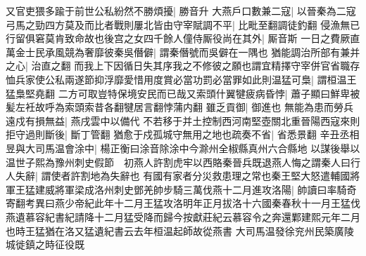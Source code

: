 又官吏猥多踰于前世公私紛然不勝煩擾|{
	勝音升}
大燕戶口數兼二寇|{
	以晉秦為二寇}
弓馬之勁四方莫及而比者戰則屢北皆由守宰賦調不平|{
	比毗至翻調徒釣翻}
侵漁無已行留俱窘莫肯致命故也後宫之女四千餘人僮侍厮役尚在其外|{
	厮音斯}
一日之費厥直萬金士民承風競為奢靡彼秦吳僭僻|{
	謂秦僭號而吳僻在一隅也}
猶能調治所部有兼并之心|{
	治直之翻}
而我上下因循日失其序我之不修彼之願也謂宜精擇守宰併官省職存恤兵家使公私兩遂節抑浮靡愛惜用度賞必當功罰必當罪如此則温猛可梟|{
	謂桓温王猛梟堅堯翻}
二方可取豈特保境安民而已哉又索頭什翼犍疲病昏悖|{
	蕭子顯曰鮮卑被髪左衽故呼為索頭索昔各翻犍居言翻悖蒲内翻}
雖乏貢御|{
	御進也}
無能為患而勞兵遠戍有損無益|{
	燕戌雲中以備代}
不若移于并土控制西河南堅壺關北重晉陽西寇來則拒守過則斷後|{
	斷丁管翻}
猶愈于戍孤城守無用之地也疏奏不省|{
	省悉景翻}
辛丑丞相昱與大司馬温會涂中|{
	楊正衡曰涂音除涂中今滁州全椒縣真州六合縣地}
以謀後舉以温世子熙為豫州刺史假節　初燕人許割虎牢以西賂秦晉兵既退燕人悔之謂秦人曰行人失辭|{
	謂使者許割地為失辭也}
有國有家者分災救患理之常也秦王堅大怒遣輔國將軍王猛建威將軍梁成洛州刺史鄧羌帥步騎三萬伐燕十二月進攻洛陽|{
	帥讀曰率騎奇寄翻考異曰燕少帝紀此年十二月王猛攻洛明年正月拔洛十六國秦春秋十一月王猛伐燕遺慕容紀書紀請降十二月猛受降而歸今按獻莊紀云慕容令之奔還鄴建熙元年二月也時王猛猶在洛又猛遺紀書云去年桓温起師故從燕書}
大司馬温發徐兖州民築廣陵城徙鎮之時征役既

